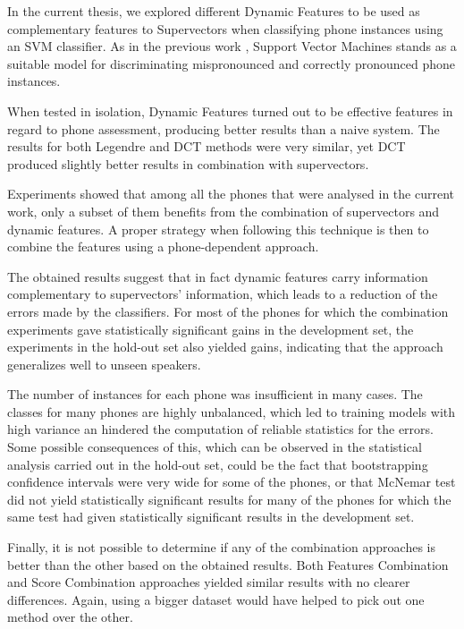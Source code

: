 In the current thesis, we explored different Dynamic Features to be used as complementary features to
Supervectors when classifying phone instances using an SVM classifier. As in the previous work \cite{main},
Support Vector Machines stands as a suitable model for discriminating mispronounced and correctly
pronounced phone instances.

When tested in isolation, Dynamic Features turned out to be effective features in regard to
phone assessment, producing better results than a naive system.
The results for both
Legendre and DCT methods were very similar, yet DCT produced slightly better results in combination with
supervectors.

Experiments showed that among all the phones that were analysed in the current work, only a subset of them
benefits from the combination of supervectors and dynamic features. A proper strategy when following this
technique is then to combine the features using a phone-dependent approach.

The obtained results suggest that in fact dynamic features carry
information complementary to supervectors' information, which leads to a reduction of the errors
made by the classifiers. For most of the phones for which the combination experiments gave statistically significant gains in the development set, the experiments in the hold-out set also yielded gains,
indicating that the approach generalizes well to unseen speakers.

The number of instances for each phone was insufficient in many cases. The classes for many
phones are highly unbalanced, which led to training models with high variance an
hindered the computation of reliable statistics for the errors.
Some possible consequences
of this, which can be observed in the statistical analysis carried out in the hold-out set,
could be the fact that bootstrapping
confidence intervals were very wide for some of the phones,
or that McNemar test did not yield statistically significant results for many of the phones
for which the same test had given statistically significant results in the development set.

Finally, it is not possible to determine if any of the combination approaches is better than the other based
on the obtained results. Both Features Combination and Score Combination approaches yielded
similar results with no clearer differences. Again, using a bigger dataset would have helped to pick out one
method over the other.
